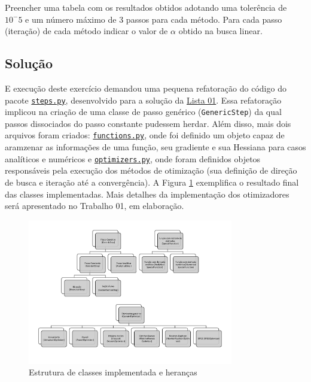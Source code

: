 \documentclass[10pt, a4paper]{article}
\begin{document}
Preencher uma tabela com os resultados obtidos adotando uma tolerência de $10^-5$ e um número máximo de 3 passos para cada método. Para cada passo (iteração)
de cada método indicar o valor de $\alpha$ obtido na busca linear.


\subsection{Solução}

E execução deste exercício demandou uma pequena refatoração do código do pacote {\tt \href{https://github.com/prj-phcp/MEC2403_Activities/blob/master/packages/steps.py}{steps.py}},
desenvolvido para a solução da \href{https://github.com/prj-phcp/MEC2403_Activities/blob/master/Lista1/Lista1.pdf}{Lista 01}. Essa refatoração implicou na criação de uma 
classe de passo genérico ({\tt GenericStep}) da qual passos dissociados do passo constante pudessem herdar. Além disso, mais dois arquivos foram criados: 
{\tt \href{https://github.com/prj-phcp/MEC2403_Activities/blob/master/packages/functions.py}{functions.py}}, onde foi definido um objeto capaz de aramzenar as informações
de uma função, seu gradiente e sua Hessiana para casos analíticos e numéricos e {\tt \href{https://github.com/prj-phcp/MEC2403_Activities/blob/master/packages/optimizers.py}{optimizers.py}},
onde foram definidos objetos responsáveis pela execução dos métodos de otimização (sua definição de direção de busca e iteração até a convergência). A Figura \ref{fig:q1_1}
exemplifica o resultado final das classes implementadas. Mais detalhes da implementação dos otimizadores será apresentado no Trabalho 01, em elaboração.

\begin{figure}[htpb]
  \centering
  \includegraphics[width=0.8\textwidth]{../general/classes_full.pdf}
  \caption{Estrutura de classes implementada e heranças}
  \label{fig:q1_1}
\end{figure}
\end{document}
